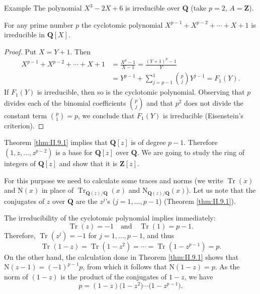 \begin{statement}{Example}
The polynomial $X^{3}-2X+6$ is irreducible over $\mathbf{Q}$ (take $p=2$,
$A=\mathbf{Z}$).
\end{statement}

\begin{theorem}
\label{thm:II.9.1}
For any prime number $p$ the cyclotomic polynomial
$X^{p-1}+X^{p-2}+\cdots+X+1$ is irreducible in $\mathbf{Q}[X]$.
\end{theorem}

\begin{proof}
Put $X=Y+1$. Then
\[
\begin{aligned}
X^{p-1}+X^{p-2}+\cdots+X+1
&=\frac{X^{p}-1}{X-1}=\frac{(Y+1)^{p}-1}{Y}\\
&=Y^{p-1}+\sum_{j=p-1}^{1}\binom{p}{j}Y^{j-1}=F_{1}(Y).
\end{aligned}
\]
If $F_{1}(Y)$ is irreducible, then so is the cyclotomic polynomial.
Observing that $p$ divides each of the binomial coefficients
$\binom{p}{j}$ and that $p^{2}$ does not divide the constant term
$\binom{p}{1}=p$, we conclude that $F_{1}(Y)$ is irreducible (Eisenstein's
criterion).
\end{proof}

Theorem \ref{thm:II.9.1} implies that $\mathbf{Q}[z]$ is of degree $p-1$.
Therefore $(1,z,\ldots,z^{p-2})$ is a base for $\mathbf{Q}[z]$ over
$\mathbf{Q}$. We are going to study the ring of integers of
$\mathbf{Q}[z]$ and show that it is $\mathbf{Z}[z]$.

For this purpose we need to calculate some traces and norms (we write
$\operatorname{Tr}(x)$ and $\mathrm{N}(x)$ in place of
$\operatorname{Tr}_{\mathbf{Q}(z)/\mathbf{Q}}(x)$ and
$\mathrm{N}_{\mathbf{Q}(z)/\mathbf{Q}}(x)$). Let us note that the conjugates
of $z$ over $\mathbf{Q}$ are the $z^{j}$'s ($j=1,\ldots,p-1$) (Theorem
\ref{thm:II.9.1}).

The irreducibility of the cyclotomic polynomial implies immediately:
\begin{equation}
\operatorname{Tr}(z)=-1\quad\text{and}\quad\operatorname{Tr}(1)=p-1.
\label{eq:II.9.1}
\end{equation}
Therefore, $\operatorname{Tr}(z^{j})=-1$ for $j=1,\ldots,p-1$, and thus
\begin{equation}
\operatorname{Tr}(1-z)=\operatorname{Tr}(1-z^{2})=\cdots=
\operatorname{Tr}(1-z^{p-1})=p.
\label{eq:II.9.2}
\end{equation}
On the other hand, the calculation done in Theorem \ref{thm:II.9.1} shows
that $\mathrm{N}(z-1)=(-1)^{p-1}p$, from which it follows that
$\mathrm{N}(1-z)=p$. As the norm of $(1-z)$ is the product of the conjugates
of $1-z$, we have
\begin{equation}
p=(1-z)\bigl(1-z^{2}\bigr)\cdots\bigl(1-z^{p-1}\bigr).
\label{eq:II.9.3}
\end{equation}

